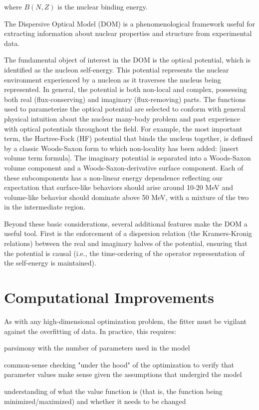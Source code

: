 where $B(N,Z)$ is the nuclear binding energy.

The Dispersive Optical Model (DOM) is a phenomenological framework useful for 
extracting information about nuclear properties and structure from experimental
data.

The fundamental object of interest in the DOM is the \Gls{optical potential},
which is identified as the \Gls{nucleon self-energy}. This potential represents
the nuclear environment experienced
by a nucleon as it traverses the nucleus being represented. In general, the
potential is both non-local and complex, possessing both real (flux-conserving)
and imaginary (flux-removing) parts. The functions used to parameterize the optical potential
are selected to conform with general physical intuition about the nuclear
many-body problem and past experience with optical potentials throughout the
field. For example, the most important term, the Hartree-Fock (HF) potential
that binds the nucleus together, is defined by a classic Woods-Saxon form to
which non-locality has been added: [insert volume term formula]. The imaginary
potential is separated into a Woods-Saxon volume component and a
Woods-Saxon-derivative surface component. Each of these subcomponents has
a non-linear energy dependence reflecting our expectation that surface-like
behaviors should arise around 10-20 MeV and volume-like behavior should dominate
above 50 MeV, with a mixture of the two in the intermediate region.

Beyond these basic considerations, several additional features make the 
DOM a useful tool. First is the enforcement of a
dispersion relation (the Kramers-Kronig relations) between the real and imaginary
halves of the potential, ensuring that the potential is causal (i.e., the
time-ordering of the operator representation of the self-energy is maintained).

\section{Computational Improvements}
As with any high-dimensional optimization problem, the fitter must be vigilant
against the overfitting of data. In practice, this requires:

parsimony with the number of parameters used in the model

common-sense checking "under the hood" of the optimization to verify that
parameter values make sense given the assumptions that undergird the model

understanding of what the value function is (that is, the function being
minimized/maximized) and whether it needs to be changed

